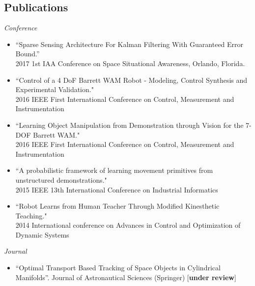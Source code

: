 \documentclass[margin,line]{resume}
\begin{document}
\begin{resume}


      \section{\mysidestyle Publications }
      \emph{Conference}
      \begin{itemize}
        \item ``Sparse Sensing Architecture For Kalman Filtering With
Guaranteed Error Bound.''\\2017 1st IAA Conference on Space Situational Awareness, Orlando, Florida.
        \item ``Control of a 4 DoF Barrett WAM Robot - Modeling, Control Synthesis and Experimental Validation."\\2016 IEEE First International Conference on Control, Measurement and Instrumentation
        \item ``Learning Object Manipulation from Demonstration through Vision for the 7-DOF Barrett WAM."\\2016 IEEE First International Conference on Control, Measurement and Instrumentation
        \item ``A probabilistic framework of learning movement primitives from unstructured demonstrations."\\2015 IEEE 13th International Conference on Industrial Informatics
        \item ``Robot Learns from Human Teacher Through Modified Kinesthetic Teaching."\\2014 International conference on Advances in Control and Optimization of Dynamic Systems
      \end{itemize}
      \emph{Journal}
      \begin{itemize}
          \item ``Optimal Transport Based Tracking of Space Objects in Cylindrical Manifolds''. Journal of Astronautical Sciences (Springer) [\textbf{under review}]
      \end{itemize}









\end{resume}
\end{document}
